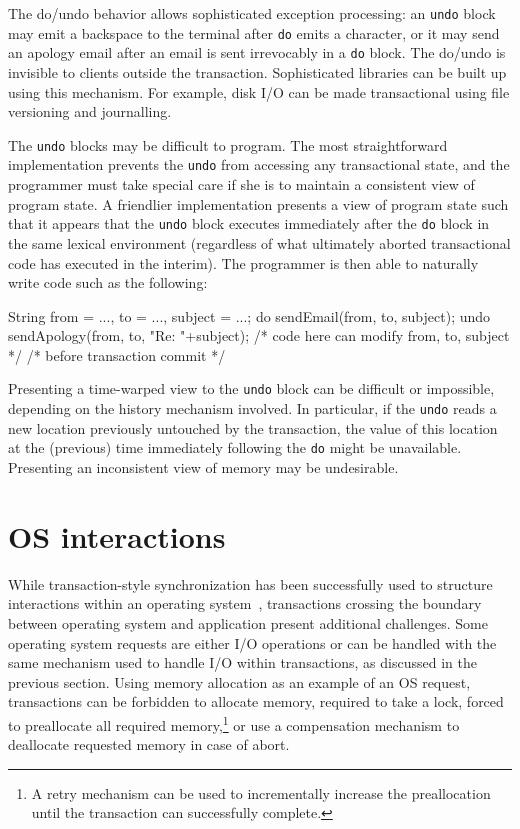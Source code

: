 The do/undo behavior allows sophisticated exception processing: an
\texttt{undo} block may emit a backspace to the terminal after
\texttt{do} emits a character, or it may send an apology email after
an email is sent irrevocably in a \texttt{do} block.  The do/undo is
invisible to clients outside the transaction.  Sophisticated
libraries can be built up using this mechanism.  For example, disk I/O
can be made transactional using file versioning and journalling.

The \texttt{undo} blocks may be difficult to program.  The most
straightforward implementation prevents the \texttt{undo} from
accessing any transactional state, and the programmer must take
special care if she is to maintain a consistent view of program state.
A friendlier implementation presents a view of program state such
that it appears that the \texttt{undo} block executes immediately
after the \texttt{do} block in the same lexical environment
(regardless of what ultimately aborted transactional code has executed
in the interim).  The programmer is then able to naturally write code
such as the following:
\begin{inlinecode}
String from = ..., to = ..., subject = ...;
do {
  sendEmail(from, to, subject);
} undo {
  sendApology(from, to, "Re: "+subject);
}
/* code here can modify from, to, subject */
/* before transaction commit */
\end{inlinecode}

Presenting a time-warped view to the \texttt{undo} block can be
difficult or impossible, depending on the history mechanism involved.
In particular, if the \texttt{undo} reads a new location previously
untouched by the transaction, the value of this location at the
(previous) time immediately following the \texttt{do} might be
unavailable.  Presenting an inconsistent view of memory may be
undesirable.

\section{OS interactions}
While transaction-style synchronization has been successfully used to
structure interactions within an operating system~\cite{MassalinPu91},
transactions crossing the boundary between operating system and
application present additional challenges.  Some operating system
requests are either I/O operations or can be handled with the same
mechanism used to handle I/O within transactions, as discussed in the
previous section.  Using memory allocation as an example of an OS
request, transactions can be forbidden to allocate memory, required to
take a lock, forced to preallocate all required memory,\footnote{A
retry mechanism can be used to incrementally increase the
preallocation until the transaction can successfully complete.} or
use a compensation mechanism to deallocate requested memory in case of
abort.

